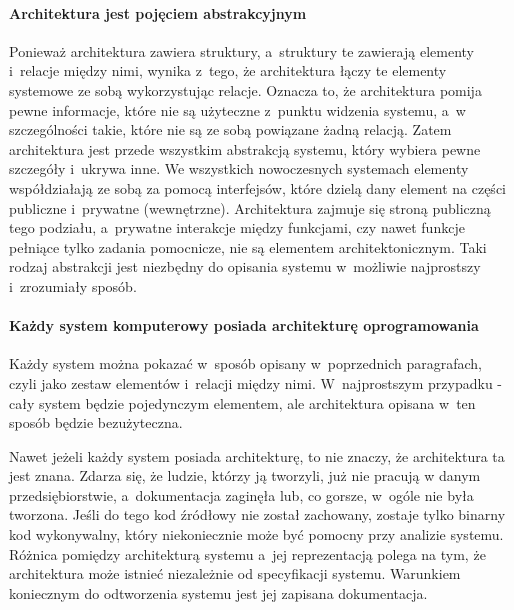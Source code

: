 \paragraph{Architektura jest pojęciem abstrakcyjnym\newline\newline}
Ponieważ architektura zawiera struktury, a~struktury te zawierają elementy i~relacje między nimi, wynika z~tego, że architektura łączy te elementy systemowe ze sobą wykorzystując relacje. Oznacza to, że architektura pomija pewne informacje, które nie są użyteczne z~punktu widzenia systemu, a~w szczególności takie, które nie są ze sobą powiązane żadną relacją. Zatem architektura jest przede wszystkim abstrakcją systemu, który wybiera pewne szczegóły i~ukrywa inne. We wszystkich nowoczesnych systemach elementy współdziałają ze sobą za pomocą interfejsów, które dzielą dany element na części publiczne i~prywatne (wewnętrzne). Architektura zajmuje się stroną publiczną tego podziału, a~prywatne interakcje między funkcjami, czy nawet funkcje pełniące tylko zadania pomocnicze, nie są elementem architektonicznym. Taki rodzaj abstrakcji jest niezbędny do opisania systemu w~możliwie najprostszy i~zrozumiały sposób.

\paragraph{Każdy system komputerowy posiada architekturę oprogramowania\newline\newline}
Każdy system można pokazać w~sposób opisany w~poprzednich paragrafach, czyli jako zestaw elementów i~relacji między nimi. W~najprostszym przypadku - cały system będzie pojedynczym elementem, ale architektura opisana w~ten sposób będzie bezużyteczna.

Nawet jeżeli każdy system posiada architekturę, to nie znaczy, że architektura ta jest znana. Zdarza się, że ludzie, którzy ją tworzyli, już nie pracują w danym przedsiębiorstwie, a~dokumentacja zaginęła lub, co gorsze, w~ogóle nie była tworzona. Jeśli do tego kod źródłowy nie został zachowany, zostaje tylko binarny kod wykonywalny, który niekoniecznie może być pomocny przy analizie systemu.
Różnica pomiędzy architekturą systemu a~jej reprezentacją polega na tym, że architektura może istnieć niezależnie od specyfikacji systemu.  Warunkiem koniecznym do odtworzenia systemu jest jej zapisana dokumentacja.

